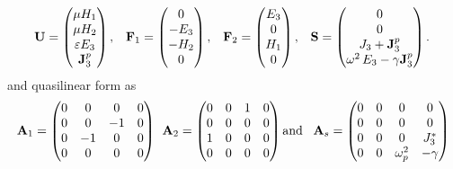 \begin{equation*}
  \begin{array}{ccccc}
    \mathbf{U} = \begin{pmatrix} \mu H_1 \\ \mu H_2 \\ \varepsilon E_3 \\ \mathbf{J}^p_3 \end{pmatrix} ,
 &
   \mathbf{F}_1 = \begin{pmatrix} 0 \\ -E_3 \\ -H_2 \\ 0 \end{pmatrix} ,
 &
   \mathbf{F}_2 = \begin{pmatrix} E_3 \\ 0 \\ H_1 \\ 0 \end{pmatrix} ,
 &
   \mathbf{S} = \begin{pmatrix} 0 \\ 0 \\ J_3 + \mathbf{J}^p_3 \\ \omega^2 \, E_3 - \gamma \mathbf{J}^p_3 \end{pmatrix} .
  \end{array}
  \:
\end{equation*}
and quasilinear form as
\begin{align*}
  \mathbf{A}_1 = 
  \begin{pmatrix}
    0 & 0 & 0 & 0 \\
    0 & 0 &-1 & 0 \\
    0 &-1 & 0 & 0 \\
    0 & 0 & 0 & 0 \\
  \end{pmatrix}
  \: \:
  \mathbf{A}_2 = 
  \begin{pmatrix}
    0 & 0 & 1 & 0 \\
    0 & 0 & 0 & 0 \\
    1 & 0 & 0 & 0 \\
    0 & 0 & 0 & 0 \\
  \end{pmatrix}
  \textrm{and}\;\;\;
  \mathbf{A}_s = 
  \begin{pmatrix}
    0 & 0 & 0 & 0 \\
    0 & 0 & 0 & 0 \\
    0 & 0 & 0 & J_{3}^* \\
    0 & 0 & \omega_p^2 & -\gamma \\
  \end{pmatrix}
\end{align*}

